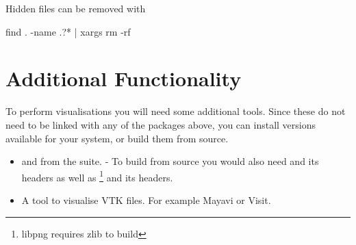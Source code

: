 Hidden files can be removed with
\begin{shellCode}
find . -name .?* | xargs rm -rf
\end{shellCode}

\section{Additional Functionality}\label{sec:linaddfunc}
To perform visualisations you will need some additional tools.
Since these do not need to be linked with any of the packages above, you can install versions available for your
system, or build them from source.
\begin{itemize}
\item {} and  from the  suite. - To build from source 
you would also need  and its headers as well as \footnote{libpng requires zlib to build} and its headers.
\item A tool to visualise VTK files. For example Mayavi or Visit.
\end{itemize}